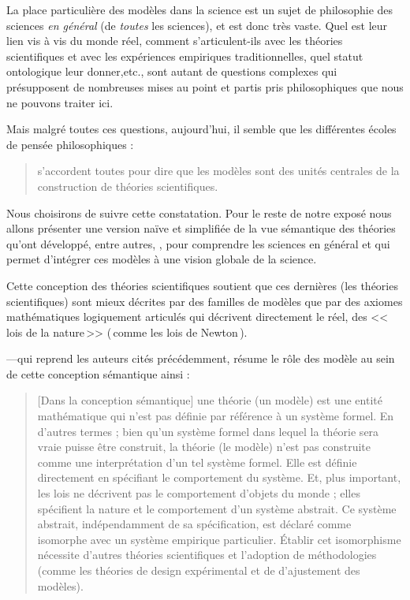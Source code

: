 La place particulière des modèles dans la science est un sujet de philosophie des sciences \emph{en général} (de \emph{toutes} les sciences), et est donc très vaste. Quel est leur lien vis à vis du monde réel, comment s'articulent-ils avec les théories scientifiques et avec les expériences empiriques traditionnelles, quel statut ontologique leur donner,etc., sont autant de questions complexes qui présupposent de nombreuses mises au point et partis pris philosophiques que nous ne pouvons traiter ici.

Mais malgré toutes ces questions, aujourd'hui, il semble que les différentes écoles de pensée philosophiques :
\begin{quote}
	s'accordent toutes pour dire que les modèles sont des unités centrales de la construction de théories scientifiques.\\ \citep{frigg2012modelsinscience}
\end{quote}

Nous choisirons de suivre cette constatation. Pour le reste de notre exposé nous allons présenter une version naïve et simplifiée de la vue sémantique des théories qu'ont développé, entre autres, \cite{suppe1989thesemanticconceptionoftheoriesandscientificrealism,vanfraassen1980thescientificimage}, pour comprendre les sciences en général et qui permet d'intégrer ces modèles à une vision globale de la science.

Cette conception des théories scientifiques soutient que ces dernières (les théories scientifiques) sont mieux décrites par des familles de modèles que par des axiomes mathématiques logiquement articulés qui décrivent directement le réel, des <<\,lois de la nature\,>> (\,comme les lois de Newton\,). 

\cite{thompson1989thestructureofbiologicaltheories} ---qui reprend les auteurs cités précédemment, résume le rôle des modèle au sein de cette conception sémantique ainsi :

\begin{quotation}
	[Dans la conception sémantique] une théorie (un modèle) est une entité mathématique qui n'est pas définie par référence à un système formel. En d'autres termes ; bien qu'un système formel dans lequel la théorie sera vraie puisse être construit, la théorie (le modèle) n'est pas construite comme une interprétation d'un tel système formel. Elle est définie directement en spécifiant le comportement du système. Et, plus important, les lois ne décrivent pas le comportement d'objets du monde ; elles spécifient la nature et le comportement d'un système abstrait. Ce système abstrait, indépendamment de sa spécification, est déclaré comme isomorphe avec un système empirique particulier. \'Etablir cet isomorphisme nécessite d'autres théories scientifiques et l'adoption de méthodologies (comme les théories de design expérimental et de d'ajustement des modèles).\\
	\citep[p. 72]{thompson1989thestructureofbiologicaltheories}
\end{quotation}

